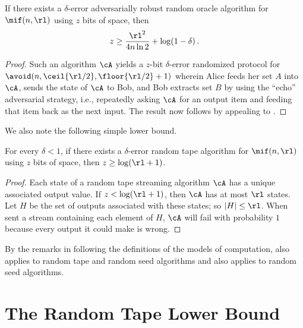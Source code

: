 \begin{itemize}
\begin{itemize}
\begin{theorem}\label{lem:ext-robust-lb}
  If there exists a $\delta$-error adversarially robust random oracle
  algorithm for $\mif(n,\rl)$ using $z$ bits of space, then
  \begin{align*}
    z \ge \frac{\rl^2}{4 n \ln 2} + \log(1-\delta) \,.
  \end{align*}
\end{theorem}
\begin{proof}
  Such an algorithm $\cA$ yields a $z$-bit $\delta$-error randomized protocol
  for $\avoid(n, \ceil{\rl/2}, \floor{\rl/2}+1)$ wherein Alice feeds her set
  $A$ into $\cA$, sends the state of $\cA$ to Bob, and Bob extracts set $B$ by
  using the ``echo'' adversarial strategy, i.e., repeatedly asking $\cA$ for
  an output item and feeding that item back as the next input. The result now
  follows by appealing to .
\end{proof}

We also note the following simple lower bound.

\begin{lemma}\label{lem:rt-triv-logr-lb}
  For every $\delta < 1$, if there exists a $\delta$-error random tape
  algorithm for $\mif(n,\rl)$ using $z$ bits of space, then $z \ge
  \log(\rl+1)$.
\end{lemma}
\begin{proof}
  Each state of a random tape streaming algorithm $\cA$ has a unique
  associated output value. If $z < \log(\rl + 1)$, then $\cA$ has at most
  $\rl$ states. Let $H$ be the set of outputs associated with these states; so
  $|H| \le \rl$. When sent a stream containing each element of $H$, $\cA$ will
  fail with probability $1$ because every output it could make is wrong.
\end{proof}

By the remarks in  following the definitions of the models of
computation,  also applies to random tape and random
seed algorithms and  also applies to random seed
algorithms.


\section{The Random Tape Lower Bound}\label{sec:rt-lb}


\end{itemize}
\end{itemize}
